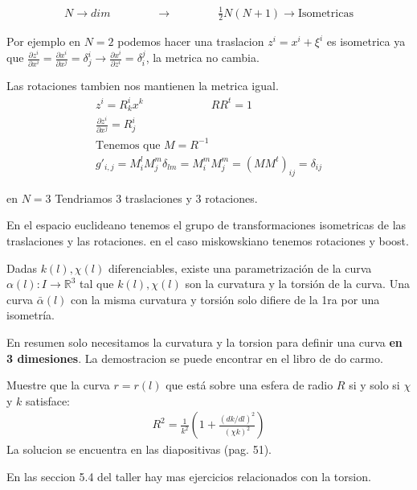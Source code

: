 \documentclass{article}
\newcommand{\caja}[3]{%
  \begin{tcolorbox}[colback=#1!5!white,colframe=#1!25!black,title=#2]
    #3
  \end{tcolorbox}%
}
\begin{document}
\begin{gather}
  N \rightarrow dim \qquad \qquad \rightarrow \qquad \qquad \frac{1}{2}N(N+1) \rightarrow \text{Isometricas}
\end{gather}

Por ejemplo en $ N = 2  $ podemos hacer una traslacion $ z^i = x^i+ \xi^i $ es isometrica ya que $ \frac{\partial z^i  }{\partial x^i } = \frac{\partial x^i  }{\partial x^j } = \delta_j^i \rightarrow \frac{\partial x^i  }{\partial z^i } = \delta_i^j  $, la metrica no cambia.

Las rotaciones tambien nos mantienen la metrica igual.
\begin{gather}
   z ^ {i } = R _{k } ^ {i } x ^ {k } \qquad \qquad \qquad RR ^ {t } = 1 \\
   \frac{\partial z^i  }{\partial x^j } = R _{j } ^ {i }\\
   \text{Tenemos que } M = R ^ {-1 }\\
   g' _{i,j } = M _{i } ^ {l } M _{j } ^ {m } \delta _{lm } = M _{i } ^ {m }M _{j } ^ {m } = (MM ^ {t })_{ij } = \delta _{ij } 
\end{gather}

en $ N=3  $ Tendriamos 3 traslaciones y 3 rotaciones.

\caja{black}{Transformaciones isometricas en el espacio euclideano }{
  En el espacio euclideano tenemos el grupo de transformaciones isometricas de las traslaciones y las rotaciones.
  \tcblower 
  en el caso miskowskiano tenemos rotaciones y boost.
}


\caja{green}{Teorema fundamental de la teoría local de curvas }{
  Dadas $ k(l),\chi(l) $ diferenciables, existe una parametrización de la curva $ \alpha(l): I \rightarrow \mathbb{R}^ {3 } $ tal que $ k(l), \chi(l) $ son la curvatura y la torsión de la curva. Una curva $ \bar \alpha(l) $ con la misma curvatura y torsión solo difiere de la 1ra por una isometría.

  \tcblower

  En resumen solo necesitamos la curvatura y la torsion para definir una curva \textbf{en 3 dimesiones}. La demostracion se puede encontrar en el libro de do carmo.
}

\caja{blue}{Ejercicio }{
  Muestre que la curva $ r=r(l) $ que está sobre una esfera de radio $R$ si y solo si $\chi$ y $k$ satisface:
  \begin{gather}
     R ^2 = \frac{1}{k ^2}\left(1+ \frac{(dk/dl) ^2}{(\chi k)^2}\right)
  \end{gather}
  \tcblower 
  La solucion se encuentra en las diapositivas (pag. 51).
}
\caja{black}{Ejercicios relacionados}{
  En las seccion 5.4 del taller hay mas ejercicios relacionados con la torsion.
}
\end{document}
